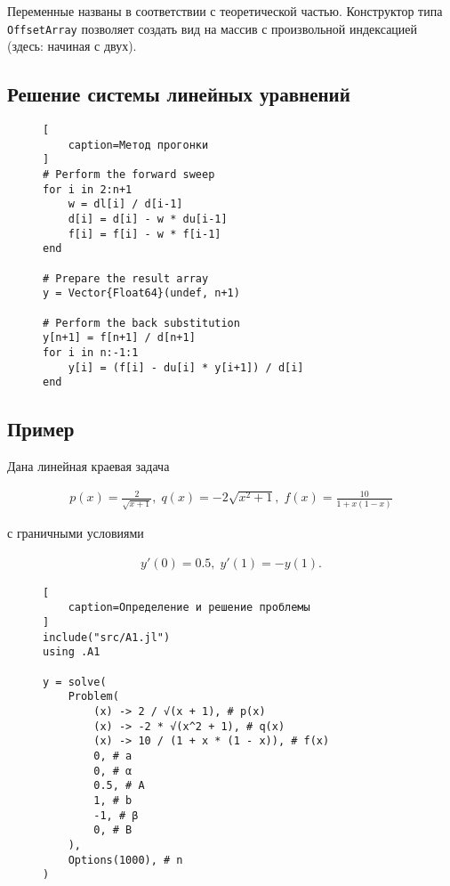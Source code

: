 Переменные названы в соответствии с теоретической частью. Конструктор типа {\footnotesize \texttt{OffsetArray}} позволяет создать вид на массив с произвольной индексацией (здесь: начиная с двух).

\subsection{Решение системы линейных уравнений}

\begin{figure}[H]
\begin{lstlisting}[
    caption=Метод прогонки
]
# Perform the forward sweep
for i in 2:n+1
    w = dl[i] / d[i-1]
    d[i] = d[i] - w * du[i-1]
    f[i] = f[i] - w * f[i-1]
end

# Prepare the result array
y = Vector{Float64}(undef, n+1)

# Perform the back substitution
y[n+1] = f[n+1] / d[n+1]
for i in n:-1:1
    y[i] = (f[i] - du[i] * y[i+1]) / d[i]
end
\end{lstlisting}
\end{figure}

\subsection{Пример}

Дана линейная краевая задача

\hs
\begin{gather}
    p(x) = \frac{2}{\sqrt{x+1}}, \;
    q(x) = -2 \sqrt{x^2 + 1}, \;
    f(x) = \frac{10}{1 + x (1-x)}
\end{gather}

с граничными условиями

\hs
\begin{gather}
y'(0) = 0.5, \; y'(1) = -y(1).
\end{gather}

\begin{figure}[H]
\begin{lstlisting}[
    caption=Определение и решение проблемы
]
include("src/A1.jl")
using .A1

y = solve(
    Problem(
        (x) -> 2 / √(x + 1), # p(x)
        (x) -> -2 * √(x^2 + 1), # q(x)
        (x) -> 10 / (1 + x * (1 - x)), # f(x)
        0, # a
        0, # α
        0.5, # A
        1, # b
        -1, # β
        0, # B
    ),
    Options(1000), # n
)
\end{lstlisting}
\end{figure}

